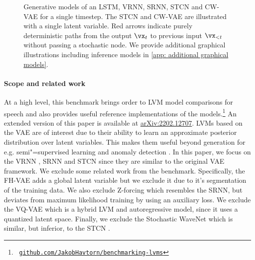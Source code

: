 {\begin{figure*}[t!]
\begin{multicols}{5}
{
    }
    \end{multicols}
\caption{
Generative models of an LSTM, VRNN, SRNN, STCN and CW-VAE for a single timestep. The STCN and CW-VAE are illustrated with a single latent variable. 
Red arrows indicate purely deterministic paths from the output $\vx_t$ to previous input $\vx_{<t}$ without passing a stochastic node. 
We provide additional graphical illustrations including inference models in \cref{app: additional graphical models}.
}
\label{fig: autoregressive vrnn srnn cwvae 1L graphs}
\end{figure*}

\paragraph{Scope and related work} 
At a high level, this benchmark brings order to LVM model comparisons for speech and also provides useful reference implementations of the models.\footnote{\texttt{ \href{https://github.com/JakobHavtorn/benchmarking-lvms}{github.com/JakobHavtorn/benchmarking-lvms}}} 
An extended version of this paper is available at \href{https://arxiv.org/abs/2202.12707}{arXiv:2202.12707}.
LVMs based on the VAE are of interest due to their ability to learn an approximate posterior distribution over latent variables. This makes them useful beyond generation for e.g. semi"=supervised learning \parencite{kingma_semi-supervised_2014} and anomaly detection \parencite{havtorn_hierarchical_2021}. 
In this paper, we focus on the VRNN \parencite{chung_recurrent_2015}, SRNN \parencite{fraccaro_sequential_2016} and STCN \parencite{aksan_stcn_2019} since they are similar to the original VAE framework. 
We exclude some related work from the benchmark. Specifically, the FH-VAE \parencite{hsu_unsupervised_2017} adds a global latent variable but we exclude it due to it's segmentation of the training data. We also exclude Z-forcing \parencite{goyal_zforcing_2017} which resembles the SRNN, but deviates from maximum likelihood training by using an auxiliary loss. We exclude the VQ-VAE \parencite{oord_neural_2018} which is a hybrid LVM and autoregressive model, since it uses a quantized latent space. Finally, we exclude the Stochastic WaveNet \parencite{lai_stochastic_2018} which is similar, but inferior, to the STCN \parencite{aksan_stcn_2019}.

}
